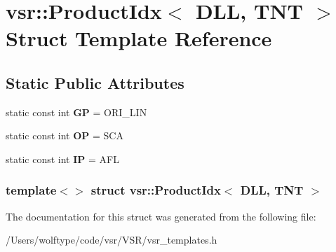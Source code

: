 \hypertarget{structvsr_1_1_product_idx_3_01_d_l_l_00_01_t_n_t_01_4}{\section{vsr\-:\-:Product\-Idx$<$ D\-L\-L, T\-N\-T $>$ Struct Template Reference}
\label{structvsr_1_1_product_idx_3_01_d_l_l_00_01_t_n_t_01_4}
}
\subsection*{Static Public Attributes}
\begin{DoxyCompactItemize}
\item 
\hypertarget{structvsr_1_1_product_idx_3_01_d_l_l_00_01_t_n_t_01_4_a77d5f4b2e22f3523647b78b213f02578}{static const int {\bfseries G\-P} = O\-R\-I\-\_\-\-L\-I\-N}\label{structvsr_1_1_product_idx_3_01_d_l_l_00_01_t_n_t_01_4_a77d5f4b2e22f3523647b78b213f02578}

\item 
\hypertarget{structvsr_1_1_product_idx_3_01_d_l_l_00_01_t_n_t_01_4_a62acfea32af3bf9b4e154be58882174c}{static const int {\bfseries O\-P} = S\-C\-A}\label{structvsr_1_1_product_idx_3_01_d_l_l_00_01_t_n_t_01_4_a62acfea32af3bf9b4e154be58882174c}

\item 
\hypertarget{structvsr_1_1_product_idx_3_01_d_l_l_00_01_t_n_t_01_4_a50babf0e08465bbdda2528eec5b41401}{static const int {\bfseries I\-P} = A\-F\-L}\label{structvsr_1_1_product_idx_3_01_d_l_l_00_01_t_n_t_01_4_a50babf0e08465bbdda2528eec5b41401}

\end{DoxyCompactItemize}
\subsubsection*{template$<$$>$ struct vsr\-::\-Product\-Idx$<$ D\-L\-L, T\-N\-T $>$}



The documentation for this struct was generated from the following file\-:\begin{DoxyCompactItemize}
\item 
/\-Users/wolftype/code/vsr/\-V\-S\-R/vsr\-\_\-templates.\-h\end{DoxyCompactItemize}

